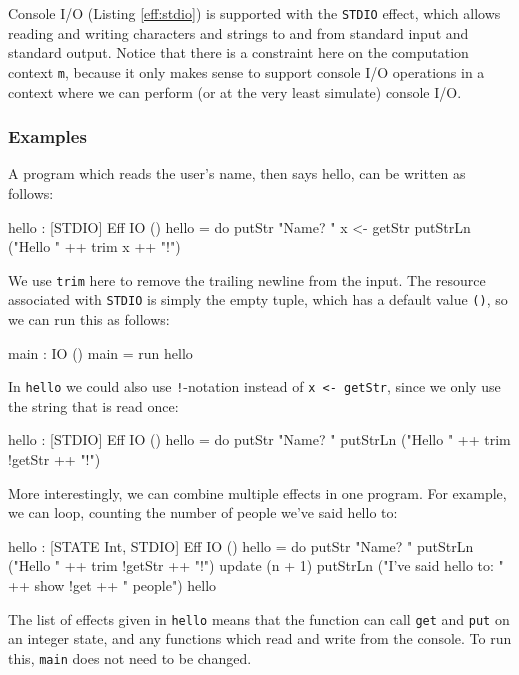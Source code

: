 \noindent
Console I/O (Listing \ref{eff:stdio})
is supported with the \texttt{STDIO} effect, which allows reading
and writing characters and strings to and from standard input and standard
output. Notice that there is a constraint here on the computation context
\texttt{m}, because it only makes sense to support console I/O operations in
a context where we can perform (or at the very least simulate) console I/O.

\subsubsection*{Examples}

A program which reads the user's name, then says hello, can be written
as follows:

\begin{code}
hello : { [STDIO] } Eff IO ()
hello = do putStr "Name? "
           x <- getStr
           putStrLn ("Hello " ++ trim x ++ "!")
\end{code}

\noindent
We use \texttt{trim} here to remove the trailing newline from the input.
The resource associated with \texttt{STDIO} is simply the empty tuple, which
has a default value \texttt{()}, so we can run this as follows:

\begin{code}
main : IO ()
main = run hello
\end{code}

\noindent
In \texttt{hello} we could also use \texttt{!}-notation instead of \texttt{x <-
getStr}, since we only use the string that is read once:

\begin{code}
hello : { [STDIO] } Eff IO ()
hello = do putStr "Name? "
           putStrLn ("Hello " ++ trim !getStr ++ "!")
\end{code}

\noindent
More interestingly, we can combine multiple effects in one program. For example,
we can loop, counting the number of people we've said hello to:

\begin{code}
hello : { [STATE Int, STDIO] } Eff IO ()
hello = do putStr "Name? "
           putStrLn ("Hello " ++ trim !getStr ++ "!")
           update (n + 1)
           putStrLn ("I've said hello to: " ++ show !get ++ " people")
           hello
\end{code}

\noindent
The list of effects given in \texttt{hello} means that the function can
call \texttt{get} and \texttt{put} on an integer state, and any functions
which read and write from the console. To run this, \texttt{main} does
not need to be changed.

